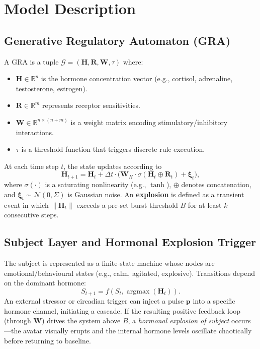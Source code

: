 \documentclass[conference]{IEEEtran}
\begin{document}
\section{Model Description}
\subsection{Generative Regulatory Automaton (GRA)}
A GRA is a tuple $\mathcal{G} = (\mathbf{H}, \mathbf{R}, \mathbf{W}, \tau)$ where:
\begin{itemize}
    \item $\mathbf{H} \in \mathbb{R}^n$ is the hormone concentration vector (e.g., cortisol, adrenaline, testosterone, estrogen).
    \item $\mathbf{R} \in \mathbb{R}^{m}$ represents receptor sensitivities.
    \item $\mathbf{W} \in \mathbb{R}^{n \times (n+m)}$ is a weight matrix encoding stimulatory/inhibitory interactions.
    \item $\tau$ is a threshold function that triggers discrete rule execution.
\end{itemize}
At each time step $t$, the state updates according to
\begin{equation}
    \mathbf{H}_{t+1} = \mathbf{H}_t + \Delta t \cdot \big( \mathbf{W}_{H} \cdot \sigma(\mathbf{H}_t \oplus \mathbf{R}_t) + \boldsymbol{\xi}_t \big),
    \label{eq:update}
\end{equation}
where $\sigma(\cdot)$ is a saturating nonlinearity (e.g., $\tanh$), $\oplus$ denotes concatenation, and $\boldsymbol{\xi}_t \sim \mathcal{N}(0,\Sigma)$ is Gaussian noise. An \textbf{explosion} is defined as a transient event in which $\|\mathbf{H}_t\|$ exceeds a pre-set burst threshold $B$ for at least $k$ consecutive steps.

\subsection{Subject Layer and Hormonal Explosion Trigger}
The subject is represented as a finite-state machine whose nodes are emotional/behavioural states (e.g., calm, agitated, explosive). Transitions depend on the dominant hormone:
\begin{equation}
    S_{t+1} = f(S_t, \operatorname{argmax}(\mathbf{H}_t)).
\end{equation}
An external stressor or circadian trigger can inject a pulse $\mathbf{p}$ into a specific hormone channel, initiating a cascade. If the resulting positive feedback loop (through $\mathbf{W}$) drives the system above $B$, a \emph{hormonal explosion of subject} occurs—the avatar visually erupts and the internal hormone levels oscillate chaotically before returning to baseline.
\end{document}
